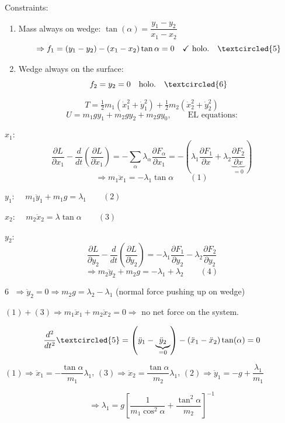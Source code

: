 Constraints:
\begin{enumerate}
    \item Mass always on wedge: $\tan(\alpha) = \dfrac{y_1 - y_2}{x_1 - x_2}$
    \[
        \Rightarrow f_1 = (y_1 - y_2) - (x_1 - x_2)\tan\alpha = 0 \quad \checkmark \text{ holo.} \quad \textcircled{\small 5}
    \]
    \item Wedge always on the surface:
    \[
        f_2 = y_2 = 0 \quad \text{holo.} \quad \textcircled{\small 6}
    \]
\end{enumerate}

\[
    T = \tfrac{1}{2}m_1(\dot{x}_1^2 + \dot{y}_1^2) + \tfrac{1}{2}m_2(\dot{x}_2^2 + \dot{y}_2^2)
\]
\[
    U = m_1 g y_1 + m_2 g y_2 + m_2 g y_0, \qquad \text{EL equations:}
\]

$x_1$:
\[
    \frac{\partial L}{\partial x_1} - \frac{d}{dt}\!\left(\frac{\partial L}{\partial \dot{x}_1}\right) = -\sum_\alpha \lambda_\alpha \frac{\partial F_\alpha}{\partial x_1} = -\!\left(\lambda_1\frac{\partial F_1}{\partial x} + \lambda_2\underbrace{\frac{\partial F_2}{\partial x}}_{=0}\right)
\]
\[
    \Rightarrow m_1\ddot{x}_1 = -\lambda_1\tan\alpha \qquad (1)
\]

$y_1$: $\quad m_1\ddot{y}_1 + m_1 g = \lambda_1 \qquad (2)$

$x_2$: $\quad m_2\ddot{x}_2 = \lambda\tan\alpha \qquad (3)$

$y_2$:
\[
    \frac{\partial L}{\partial y_2} - \frac{d}{dt}\!\left(\frac{\partial L}{\partial \dot{y}_2}\right) = -\lambda_1\frac{\partial F_1}{\partial y_2} - \lambda_2\frac{\partial F_2}{\partial y_2}
\]
\[
    \Rightarrow m_2\ddot{y}_2 + m_2 g = -\lambda_1 + \lambda_2 \qquad (4)
\]

\textcircled{\small 6} $\Rightarrow \ddot{y}_2 = 0 \Rightarrow m_2 g = \lambda_2 - \lambda_1$ \quad (normal force pushing up on wedge)

$(1) + (3) \Rightarrow m_1\ddot{x}_1 + m_2\ddot{x}_2 = 0 \Rightarrow$ no net force on the system.

\[
    \frac{d^2}{dt^2}\textcircled{\small 5} = \left(\ddot{y}_1 - \underbrace{\ddot{y}_2}_{=0}\right) - (\ddot{x}_1 - \ddot{x}_2)\tan(\alpha) = 0
\]

$(1) \Rightarrow \ddot{x}_1 = -\dfrac{\tan\alpha}{m_1}\lambda_1$, \quad $(3) \Rightarrow \ddot{x}_2 = \dfrac{\tan\alpha}{m_2}\lambda_1$, \quad $(2) \Rightarrow \ddot{y}_1 = -g + \dfrac{\lambda_1}{m_1}$

\[
    \Rightarrow \lambda_1 = g\!\left[\frac{1}{m_1\cos^2\alpha} + \frac{\tan^2\alpha}{m_2}\right]^{-1}
\]

